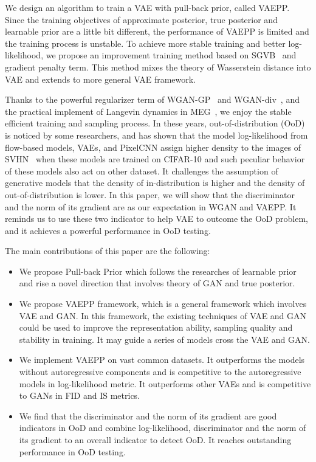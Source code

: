 We design an algorithm to train a VAE with pull-back prior, called VAEPP. Since the training objectives of approximate posterior, true posterior and learnable prior are a little bit different, the performance of VAEPP is limited and the training process is unstable. To achieve more stable training and better log-likelihood, we propose an improvement training method based on SGVB~\cite{kingma2014auto} and gradient penalty term. This method mixes the theory of Wasserstein distance into VAE and extends to more general VAE framework. 

Thanks to the powerful regularizer term of WGAN-GP~\cite{gulrajani2017improved} and WGAN-div~\cite{wu2018wasserstein}, and the practical implement of Langevin dynamics in MEG~\cite{kumar2019maximum}, we enjoy the stable efficient training and sampling process. In these years, out-of-distribution (OoD) is noticed by some researchers, and \cite{nalisnick2018deep} has shown that the model log-likelihood from flow-based models, VAEs, and PixelCNN assign higher density to the images of SVHN~\cite{netzer2011reading} when these models are trained on CIFAR-10 and such peculiar behavior of these models also act on other dataset. It challenges the assumption of generative models that the density of in-distribution is higher and the density of out-of-distribution is lower. In this paper, we will show that the discriminator and the norm of its gradient are as our expectation in WGAN and VAEPP. It reminds us to use these two indicator to help VAE to outcome the OoD problem, and it achieves a powerful performance in OoD testing.

The main contributions of this paper are the following:
\begin{itemize}
	\item We propose Pull-back Prior which follows the researches of learnable prior and rise a novel direction that involves theory of GAN and  true posterior. 
	\item We propose VAEPP framework, which is a general framework which involves VAE and GAN. In this framework, the existing techniques of VAE and GAN could be used to improve the representation ability, sampling quality and stability in training. It may guide a series of models cross the VAE and GAN. 
	\item We implement VAEPP on vast common datasets. It outperforms the models without autoregressive components and is competitive to the autoregressive models in log-likelihood metric. It outperforms other VAEs and is competitive to GANs in FID and IS metrics. 
	\item We find that the discriminator and the norm of its gradient are good indicators in OoD and combine log-likelihood, discriminator and the norm of its gradient to an overall indicator to detect OoD. It reaches outstanding performance in OoD testing.
\end{itemize}
